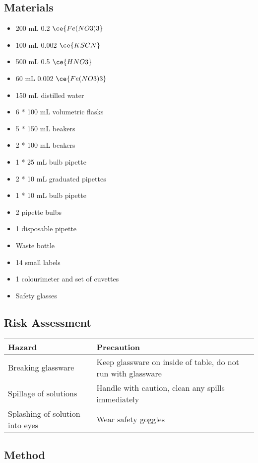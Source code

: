 	\subsection{Materials}
		\begin{itemize}
			\item 200 mL 0.2 \unit{\moLar} $\ce{Fe(NO3)3}$
			\item 100 mL 0.002 \unit{\moLar} $\ce{KSCN}$
			\item 500 mL 0.5 \unit{\moLar} $\ce{HNO3}$
			\item 60 mL 0.002 \unit{\moLar} $\ce{Fe(NO3)3}$
			\item 150 mL distilled water
			\item 6 * 100 mL volumetric flasks
			\item 5 * 150 mL beakers
			\item 2 * 100 mL beakers
			\item 1 * 25 mL bulb pipette
			\item 2 * 10 mL graduated pipettes
			\item 1 * 10 mL bulb pipette
			\item 2 pipette bulbs
			\item 1 disposable pipette
			\item Waste bottle
			\item 14 small labels
			\item 1 colourimeter and set of cuvettes
			\item Safety glasses
		\end{itemize}

	\subsection{Risk Assessment}
		\begin{table}[htbp]
			\centering
			\begin{tabular}{ll}
				\hline
				Hazard & Precaution \\ \hline
				Breaking glassware & Keep glassware on inside of table, do not run with glassware \\
				Spillage of solutions & Handle with caution, clean any spills immediately \\
				Splashing of solution into eyes & Wear safety goggles \\ \hline
			\end{tabular}
		\end{table}
	
	\subsection{Method}
